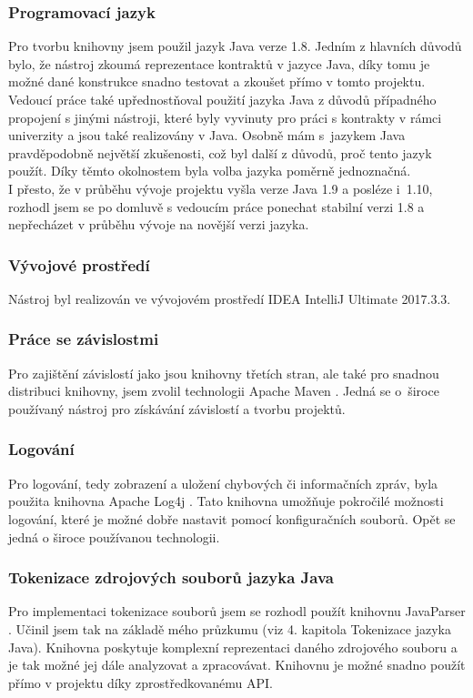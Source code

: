 	    	\subsubsection{Programovací jazyk}
				Pro tvorbu knihovny jsem použil jazyk Java verze 1.8. Jedním z hlavních důvodů bylo, že nástroj zkoumá reprezentace kontraktů v jazyce Java, díky tomu je možné dané konstrukce snadno testovat a zkoušet přímo v tomto projektu. Vedoucí práce také upřednostňoval použití jazyka Java z důvodů případného propojení s jinými nástroji, které byly vyvinuty pro práci s kontrakty v rámci univerzity a jsou také realizovány v Java. Osobně mám s~jazykem Java pravděpodobně největší zkušenosti, což byl další z důvodů, proč tento jazyk použít. Díky těmto okolnostem byla volba jazyka poměrně jednoznačná.\\
				
				I přesto, že v průběhu vývoje projektu vyšla verze Java 1.9 a posléze i~1.10, rozhodl jsem se po domluvě s vedoucím práce ponechat stabilní verzi 1.8 a nepřecházet v průběhu vývoje na novější verzi jazyka.
				
			\subsubsection{Vývojové prostředí}				
				Nástroj byl realizován ve vývojovém prostředí IDEA IntelliJ Ultimate 2017.3.3.
	    	
			\subsubsection{Práce se závislostmi}
				Pro zajištění závislostí jako jsou knihovny třetích stran, ale také pro snadnou distribuci knihovny, jsem zvolil technologii Apache Maven \cite{maven}. Jedná se o~široce používaný nástroj pro získávání závislostí a tvorbu projektů.
				
			\subsubsection{Logování}
				Pro logování, tedy zobrazení a uložení chybových či informačních zpráv, byla použita knihovna Apache Log4j \cite{log4j}. Tato knihovna umožňuje pokročilé možnosti logování, které je možné dobře nastavit pomocí konfiguračních souborů. Opět se jedná o široce používanou technologii.
				
			\subsubsection{Tokenizace zdrojových souborů jazyka Java}
				Pro implementaci tokenizace souborů jsem se rozhodl použít knihovnu JavaParser \cite{javaparser}. Učinil jsem tak na základě mého průzkumu (viz 4. kapitola Tokenizace jazyka Java). Knihovna poskytuje komplexní reprezentaci daného zdrojového souboru a je tak možné jej dále analyzovat a zpracovávat. Knihovnu je možné snadno použít přímo v projektu díky zprostředkovanému API.
			
